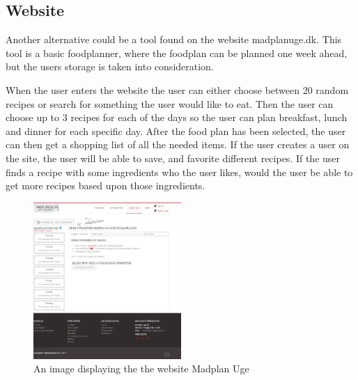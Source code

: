 \subsection{Website}
Another alternative could be a tool found on the website madplanuge.dk\cite{madSpild_madPlanUge}. This tool is a basic foodplanner, where the foodplan can be planned one week ahead, but the users storage is taken into consideration.

When the user enters the website the user can either choose between 20 random recipes or search for something the user would like to eat.
Then the user can choose up to 3 recipes for each of the days so the user can plan breakfast, lunch and dinner for each specific day.
After the food plan has been selected, the user can then get a shopping list of all the needed items.
If the user creates a user on the site, the user will be able to save, and favorite different recipes.
If the user finds a recipe with some ingredients who the user likes, would the user be able to get more recipes based upon those ingredients.

\begin{figure}[H]
    \centering
    \includegraphics[width=0.5\textwidth]{Grafik/madplanuge}
    \caption{An image displaying the the website Madplan Uge}
    \label{MadPlanUge}
\end{figure}
